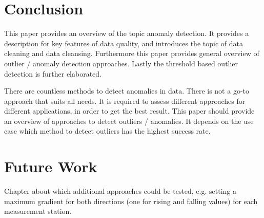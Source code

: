 \chapter{Conclusion}
This paper provides an overview of the topic anomaly detection. It provides a description for key features of data quality, and introduces the topic of data cleaning and data cleansing. Furthermore this paper provides general overview of outlier / anomaly detection approaches. Lastly the threshold based outlier detection is further elaborated.
\par
There are countless methods to detect anomalies in data. There is not a go-to approach that suits all needs. It is required to assess different approaches for different applications, in order to get the best result. This paper should provide an overview of approaches to detect outliers / anomalies. It depends on the use case which method to detect outliers has the highest success rate.  
\chapter{Future Work}
Chapter about which additional approaches could be tested, e.g. setting a maximum gradient for both directions (one for rising and falling values) for each measurement station. 